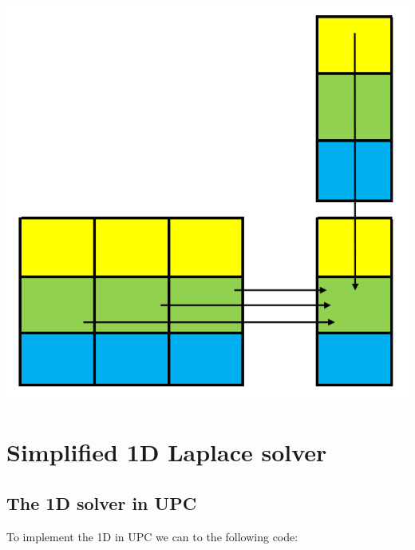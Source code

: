 \documentclass{report}
\begin{document}
\begin{center}
    \includegraphics[scale=0.5]{Images/Matrix_vector_optimized.png}
    \label{fig2}
\end{center}

\chapter{Simplified 1D Laplace solver}

\section{The 1D solver in UPC}

To implement the 1D in UPC we can to the following code:
\end{document}
